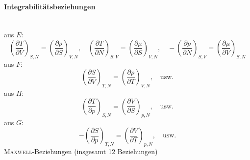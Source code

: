 \paragraph{Integrabilitätsbeziehungen} \mbox{}\\
aus $E$:
\begin{equation}
  \left( \frac{\partial T}{\partial V} \right)_{S, N} = \left( \frac{\partial p}{\partial S} \right)_{V, N}, \quad
  \left( \frac{\partial T}{\partial N} \right)_{S, V} = \left( \frac{\partial \mu}{\partial S} \right)_{V, N}, \quad
  - \left( \frac{\partial p}{\partial N} \right)_{S, V} = \left( \frac{\partial \mu}{\partial V} \right)_{S, N}
\end{equation}
aus $F$:
\begin{equation}
  \left( \frac{\partial S}{\partial V} \right)_{T, N} = \left( \frac{\partial p}{\partial T} \right)_{V, N}, \quad \text{usw.}
\end{equation}
aus $H$:
\begin{equation}
  \left( \frac{\partial T}{\partial p} \right)_{S, N} = \left( \frac{\partial V}{\partial S} \right)_{p, N}, \quad \text{usw.}
\end{equation}
aus $G$:
\begin{equation}
  - \left( \frac{\partial S}{\partial p} \right)_{T, N} = \left( \frac{\partial V}{\partial T} \right)_{p, N}, \quad \text{usw.}
\end{equation}
\textsc{Maxwell}-Beziehungen (insgesamt 12 Beziehungen) \\

